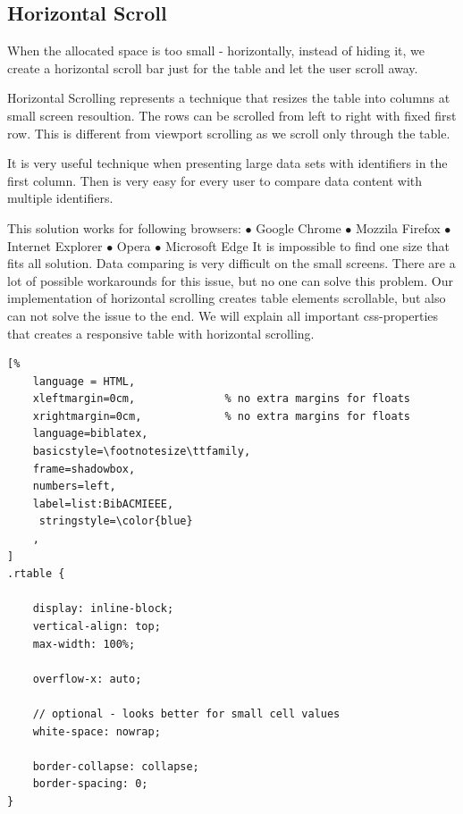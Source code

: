 \subsection{Horizontal Scroll}
When the allocated space is too small - horizontally, instead of hiding it, we create a horizontal scroll bar just for the table and let the user scroll away. 
\newline 

Horizontal Scrolling represents a technique that resizes the table  
into columns at small screen resoultion. The rows can be scrolled from left to right with fixed first row.
This is different from viewport scrolling as we scroll only through the table.
\newline 

It is very useful technique when presenting large data sets with identifiers in the first column. Then is very easy for every user to compare data content with multiple identifiers.


This solution works for following browsers:
\newline $\bullet$ Google Chrome
\newline $\bullet$ Mozzila Firefox
\newline $\bullet$ Internet Explorer
\newline $\bullet$ Opera
\newline $\bullet$ Microsoft Edge
\newline
\newline It is impossible to find one size that fits all solution. Data comparing is very difficult on the small screens.
There are a lot of possible workarounds for this issue, but no one can solve this problem. 
Our implementation of horizontal scrolling creates table elements scrollable, but also can not solve the issue to the end.
We will explain all important css-properties that creates a responsive table with horizontal scrolling.

\begin{lstlisting}[%
    language = HTML, 
    xleftmargin=0cm,              % no extra margins for floats
    xrightmargin=0cm,             % no extra margins for floats
    language=biblatex,
    basicstyle=\footnotesize\ttfamily,
    frame=shadowbox,
    numbers=left,
    label=list:BibACMIEEE,
     stringstyle=\color{blue}
    ,
]
.rtable {

    display: inline-block;
    vertical-align: top;
    max-width: 100%;

    overflow-x: auto;

    // optional - looks better for small cell values
    white-space: nowrap;

    border-collapse: collapse;
    border-spacing: 0;
}

\end{lstlisting}

